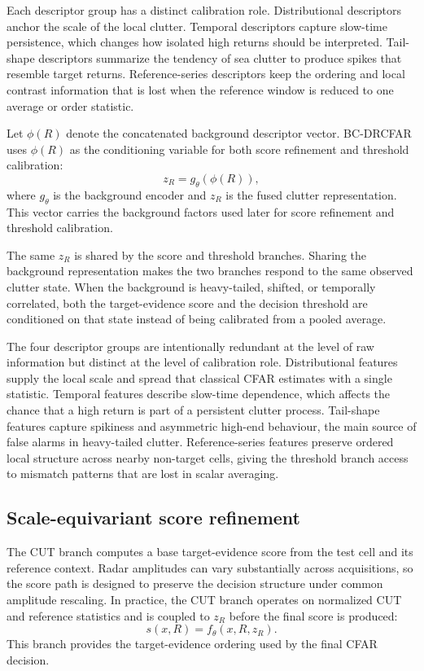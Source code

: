 \documentclass[preprint,12pt]{elsarticle}
\begin{document}
Each descriptor group has a distinct calibration role. Distributional
descriptors anchor the scale of the local clutter. Temporal descriptors capture
slow-time persistence, which changes how isolated high returns should be
interpreted. Tail-shape descriptors summarize the tendency of sea clutter to
produce spikes that resemble target returns. Reference-series descriptors keep
the ordering and local contrast information that is lost when the reference
window is reduced to one average or order statistic.

Let $\phi(R)$ denote the concatenated background descriptor vector. BC-DRCFAR
uses $\phi(R)$ as the conditioning variable for both score refinement and
threshold calibration:
\begin{equation}
  z_R = g_{\theta}(\phi(R)),
\end{equation}
where $g_{\theta}$ is the background encoder and $z_R$ is the fused clutter
representation. This vector carries the background factors used later for
score refinement and threshold calibration.

The same $z_R$ is shared by the score and threshold branches. Sharing the
background representation makes the two branches respond to the same observed
clutter state. When the background is heavy-tailed, shifted, or temporally
correlated, both the target-evidence score and the decision threshold are
conditioned on that state instead of being calibrated from a pooled average.

The four descriptor groups are intentionally redundant at the level of raw
information but distinct at the level of calibration role. Distributional
features supply the local scale and spread that classical CFAR estimates with a
single statistic. Temporal features describe slow-time dependence, which affects
the chance that a high return is part of a persistent clutter process.
Tail-shape features capture spikiness and asymmetric high-end behaviour, the
main source of false alarms in heavy-tailed clutter. Reference-series features
preserve ordered local structure across nearby non-target cells, giving the
threshold branch access to mismatch patterns that are lost in scalar averaging.

\subsection{Scale-equivariant score refinement}
\label{subsec:score-refinement}

The CUT branch computes a base target-evidence score from the test cell and its
reference context. Radar amplitudes can vary substantially across acquisitions,
so the score path is designed to preserve the decision structure under common
amplitude rescaling. In practice, the CUT branch operates on normalized CUT and
reference statistics and is coupled to $z_R$ before the final score is produced:
\begin{equation}
  s(x,R) = f_{\theta}(x,R,z_R).
\end{equation}
This branch provides the target-evidence ordering used by the final CFAR
decision.
\end{document}
